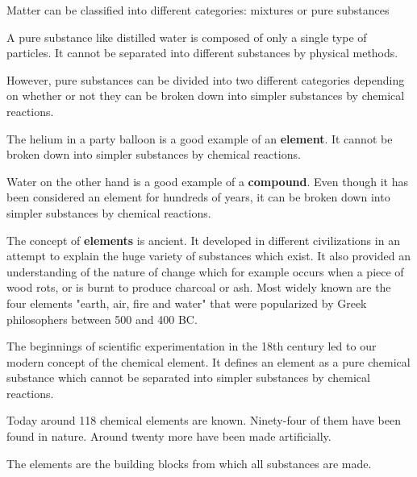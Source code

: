 

Matter can be classified into different categories: mixtures or pure substances


A pure substance like distilled water is composed of only a single type of particles. It cannot be separated into different substances by physical methods.


However, pure substances can be divided into two different categories depending on whether or not they can be broken down into simpler substances by chemical reactions.


The helium in a party balloon is a good example of an \textbf{element}. It cannot be broken down into simpler substances by chemical reactions.


Water on the other hand is a good example of a \textbf{compound}. Even though it has been considered an element for hundreds of years, it can be broken down into simpler substances by chemical reactions.


\begin{center}%
\resizebox{\linewidth}{!}{\PureSubstanceClassificationFigure}\end{center}



The concept of\textbf{ elements} is ancient. It developed in different civilizations in an attempt to explain the huge variety of substances which exist. It also provided an understanding of the nature of change which for example occurs when a piece of wood rots, or is burnt to produce charcoal or ash. Most widely known are the four elements "earth, air, fire and water" that were popularized by Greek philosophers between 500 and 400 BC.


The beginnings of scientific experimentation in the 18th century led to our modern concept of the chemical element. It defines an element as a pure chemical substance which cannot be separated into simpler substances by chemical reactions.


Today around 118 chemical elements are known. Ninety-four of them have been found in nature. Around twenty more have been made artificially.


The elements are the building blocks from which all substances are made.


